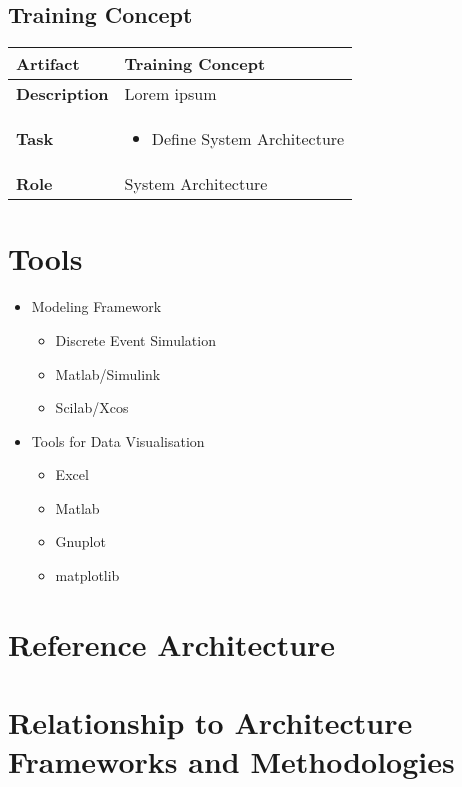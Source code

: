 \subsection{Training Concept}
\begin{minipage}{\textwidth}
 \label{table:ch6_Artifact_Training_Concept}
\begin{tabular}
	{|m{2cm}|m{10cm}|} \hline \bfseries Artifact & Training Concept\\
	\hline \bfseries Description & Lorem ipsum\\
	\hline \bfseries Task & 
	\begin{itemize}
		\item Define System Architecture 
	\end{itemize}
	\\
	\hline \bfseries Role & System Architecture\\
	\hline 
\end{tabular}
\end{minipage}

\section{Tools} %
\label{sec:ch6_tools}

\begin{itemize}
	\item Modeling Framework
	\begin{itemize}
		\item Discrete Event Simulation
		\item Matlab/Simulink
		\item Scilab/Xcos
	\end{itemize}
	\item Tools for Data Visualisation
	\begin{itemize}
		\item Excel
		\item Matlab
		\item Gnuplot
		\item matplotlib
	\end{itemize}
\end{itemize}


\section{Reference Architecture}

\section{Relationship to Architecture Frameworks and Methodologies} %
\label{sec:ch6_relation_frameworks}


